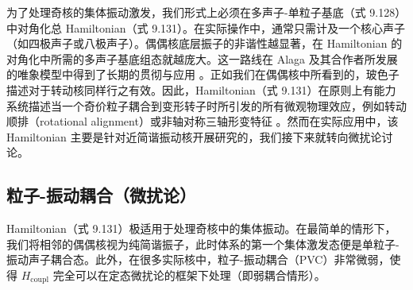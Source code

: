 为了处理奇核的集体振动激发，我们形式上必须在多声子-单粒子基底（式 9.128）中对角化总 Hamiltonian（式 9.131）。在实际操作中，通常只需计及一个核心声子（如四极声子或八极声子）。偶偶核底层振子的非谐性越显著，在
Hamiltonian 的对角化中所需的多声子基底组态就越庞大。这一路线在 Alaga 及其合作者所发展的唯象模型中得到了长期的贯彻与应用
\cite{Al67,APS75}。正如我们在偶偶核中所看到的，玻色子描述对于转动核同样行之有效。因此，Hamiltonian（式
9.131）在原则上有能力系统描述当一个奇价粒子耦合到变形转子时所引发的所有微观物理效应，例如转动顺排（rotational alignment）或非轴对称三轴形变特征
\cite{AP76,PVD77}。然而在实际应用中，该 Hamiltonian 主要是针对近简谐振动核开展研究的，我们接下来就转向微扰论讨论。

\subsection{粒子-振动耦合（微扰论）\label{subsec:9.3.3_=007C92=005B50-=00632F=0052A8=008026=005408=00FF08=005FAE=006270=008BBA=00FF09}}

Hamiltonian（式 9.131）极适用于处理奇核中的集体振动。在最简单的情形下，我们将相邻的偶偶核视为纯简谐振子，此时体系的第一个集体激发态便是单粒子-振动声子耦合态。此外，在很多实际核中，粒子-振动耦合（PVC）非常微弱，使得
$H_{\text{coupl}}$ 完全可以在定态微扰论的框架下处理（即弱耦合情形）。

